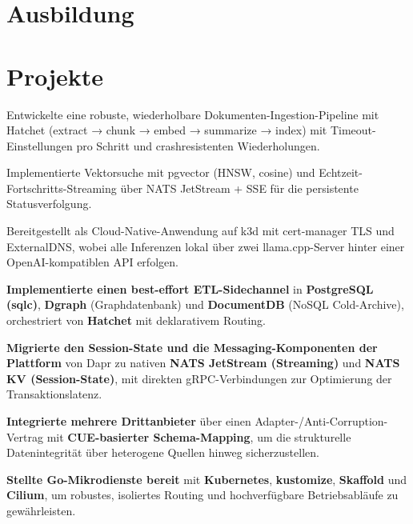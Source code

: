 \documentclass[10pt,a4paper]{resume}
\begin{document}
\section{Ausbildung}

\vspace{2pt}

\section{Projekte}

\bullets
  \item Entwickelte eine robuste, wiederholbare Dokumenten-Ingestion-Pipeline mit Hatchet (extract → chunk → embed → summarize → index) mit Timeout-Einstellungen pro Schritt und crashresistenten Wiederholungen.
  \item Implementierte Vektorsuche mit pgvector (HNSW, cosine) und Echtzeit-Fortschritts-Streaming über NATS JetStream + SSE für die persistente Statusverfolgung.
  \item Bereitgestellt als Cloud-Native-Anwendung auf k3d mit cert-manager TLS und ExternalDNS, wobei alle Inferenzen lokal über zwei llama.cpp-Server hinter einer OpenAI-kompatiblen API erfolgen.
\bulletsend
\vspace{1.0pt}
\bullets
  \item \textbf{Implementierte einen best-effort ETL-Sidechannel} in \textbf{PostgreSQL (sqlc)}, \textbf{Dgraph} (Graphdatenbank) und \textbf{DocumentDB} (NoSQL Cold-Archive), orchestriert von \textbf{Hatchet} mit deklarativem Routing.
  \item \textbf{Migrierte den Session-State und die Messaging-Komponenten der Plattform} von Dapr zu nativen \textbf{NATS JetStream (Streaming)} und \textbf{NATS KV (Session-State)}, mit direkten gRPC-Verbindungen zur Optimierung der Transaktionslatenz.
  \item \textbf{Integrierte mehrere Drittanbieter} über einen Adapter-/Anti-Corruption-Vertrag mit \textbf{CUE-basierter Schema-Mapping}, um die strukturelle Datenintegrität über heterogene Quellen hinweg sicherzustellen.
  \item \textbf{Stellte Go-Mikrodienste bereit} mit \textbf{Kubernetes}, \textbf{kustomize}, \textbf{Skaffold} und \textbf{Cilium}, um robustes, isoliertes Routing und hochverfügbare Betriebsabläufe zu gewährleisten.
\bulletsend
\end{document}

